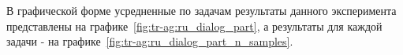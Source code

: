 В графической форме усредненные по задачам результаты данного эксперимента представлены на графике~\ref{fig:tr-ag:ru_dialog_part}, а результаты для каждой задачи - на графике~\ref{fig:tr-ag:ru_dialog_part_n_samples}. 


